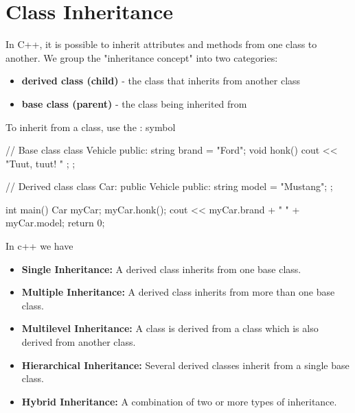 \documentclass{report}
\begin{document}
    \pagebreak \bigbreak \noindent 
    \section{Class Inheritance}
    \bigbreak \noindent 
    \begin{concept}
       In C++, it is possible to inherit attributes and methods from one class to another. We group the "inheritance concept" into two categories:
       \begin{itemize}
           \item \textbf{derived class (child)} - the class that inherits from another class
           \item \textbf{base class (parent)} - the class being inherited from
       \end{itemize}
       To inherit from a class, use the : symbol
    \end{concept}
    \bigbreak \noindent 
    \begin{cppcode}
// Base class
class Vehicle {
  public:
    string brand = "Ford";
    void honk() {
      cout << "Tuut, tuut! \n" ;
    }
};

// Derived class
class Car: public Vehicle {
  public:
    string model = "Mustang";
};

int main() {
  Car myCar;
  myCar.honk();
  cout << myCar.brand + " " + myCar.model;
  return 0;
}
    \end{cppcode}
    \bigbreak \noindent 
    In c++ we have
    \begin{itemize}
        \item \textbf{Single Inheritance:} A derived class inherits from one base class.
        \item \textbf{Multiple Inheritance:} A derived class inherits from more than one base class.
        \item \textbf{Multilevel Inheritance:} A class is derived from a class which is also derived from another class.
        \item \textbf{Hierarchical Inheritance:} Several derived classes inherit from a single base class.
        \item \textbf{Hybrid Inheritance:} A combination of two or more types of inheritance.
    \end{itemize}

    \bigbreak \noindent 
\end{document}
